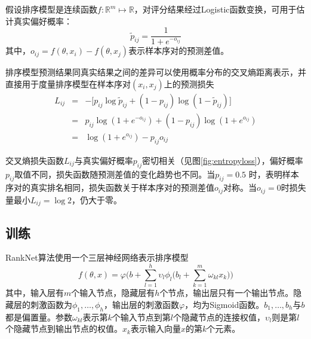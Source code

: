 假设排序模型是连续函数$f:\mathbb{R}^m\mapsto \mathbb{R}$，对评分结果经过Logistic函数变换，可用于估计真实偏好概率：
\begin{equation}
    \widetilde{p}_{ij} = \frac{1}{1+e^{-o_{ij}}}
\end{equation}
其中，$o_{ij}=f(\theta,x_i)-f(\theta,x_j)$表示样本序对的预测差值。

排序模型预测结果同真实结果之间的差异可以使用概率分布的交叉熵距离表示，并直接用于度量排序模型在样本序对$(x_i,x_j)$上的预测损失
\begin{equation}
    \begin{array}{lll}
      L_{ij} & = & -\big[p_{ij} \log \widetilde{p}_{ij} + (1-p_{ij}) \log (1-\widetilde{p}_{ij})\big] \\
       & = & p_{ij} \log(1+e^{-o_{ij}}) + (1-p_{ij}) \log(1+e^{o_{ij}}) \\
       & = & \log(1+e^{o_{ij}}) - p_{ij} o_{ij}
    \end{array}
\end{equation}

交叉熵损失函数$L_{ij}$与真实偏好概率$p_{ij}$密切相关（见图\ref{fig:entropyloss}），偏好概率$p_{ij}$取值不同，损失函数随预测差值的变化趋势也不同。当$p_{ij}=0.5$ 时，表明样本序对的真实排名相同，损失函数关于样本序对的预测差值$o_{ij}$对称。当$o_{ij}=0$时损失量最小$L_{ij}=\log 2$，仍大于零。

\subsection{训练}
RankNet算法使用一个三层神经网络表示排序模型
\begin{equation}
    f(\theta,x) = \varphi \Big(b + \sum\limits_{l=1}^h \upsilon_l \phi_l\big(b_l + \sum\limits_{k=1}^m \omega_{kl} x_k\big)\Big)
\end{equation}
其中，输入层有$m$个输入节点，隐藏层有$h$个节点，输出层只有一个输出节点。隐藏层的刺激函数为$\phi_1,\ldots,\phi_h$，输出层的刺激函数$\varphi$，均为Sigmoid函数。$b_1,\ldots,b_h$与$b$都是偏置量。参数$\omega_{kl}$表示第$k$个输入节点到第$l$个隐藏节点的连接权值，$\upsilon_l$则是第$l$个隐藏节点到输出节点的权值。$x_k$表示输入向量$x$的第$k$个元素。

